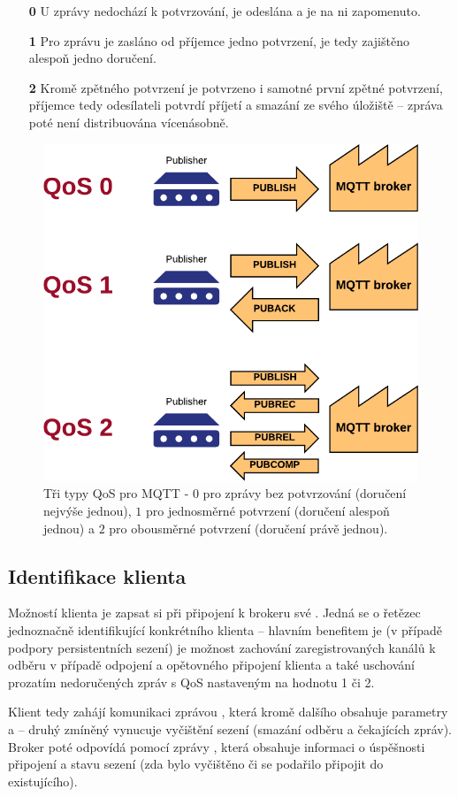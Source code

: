 \begin{enumerate}
    \item[\textbf{0}] U zprávy nedochází k potvrzování, je odeslána a je na ni zapomenuto.
    \item[\textbf{1}] Pro zprávu je zasláno od příjemce jedno potvrzení, je tedy zajištěno alespoň jedno doručení.
    \item[\textbf{2}] Kromě zpětného potvrzení je potvrzeno i samotné první zpětné potvrzení, příjemce tedy
    odesílateli potvrdí příjetí a smazání ze svého úložiště -- zpráva poté není distribuována vícenásobně.
\end{enumerate}

\begin{figure}
    \centering
    \includegraphics[width=.5\textwidth]{figures/mqtt-qos.png}
    \caption{Tři typy QoS pro MQTT - $0$ pro zprávy bez potvrzování (doručení nejvýše jednou), $1$ pro jednosměrné
    potvrzení (doručení alespoň jednou) a $2$ pro obousměrné potvrzení (doručení právě jednou).}
    \label{fig:mqtt-qos}
\end{figure}

\subsection{Identifikace klienta }\label{subsec:identifikace-klienta-client-id}
Možností klienta je zapsat si při připojení k brokeru své .
Jedná se o řetězec jednoznačně identifikující konkrétního klienta -- hlavním benefitem je (v případě podpory
persistentních sezení) je možnost zachování zaregistrovaných kanálů k odběru v případě odpojení a
opětovného připojení klienta a také uschování prozatím nedoručených zpráv s QoS nastaveným na hodnotu 1 či 2.

Klient tedy zahájí komunikaci zprávou , která kromě dalšího obsahuje parametry  a  -- druhý zmíněný vynucuje vyčištění sezení (smazání odběru a čekajících zpráv).
Broker poté odpovídá pomocí zprávy , která obsahuje informaci o úspěšnosti připojení a stavu sezení (zda
bylo vyčištěno či se podařilo připojit do existujícího).

